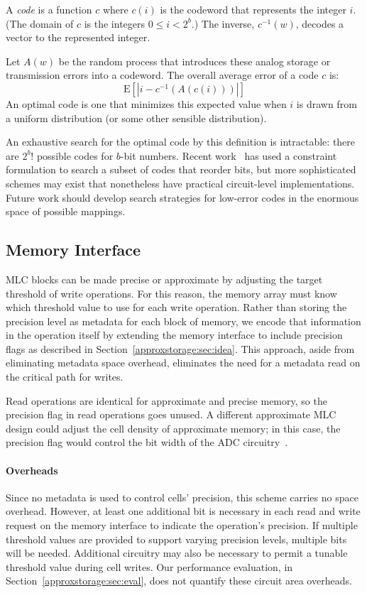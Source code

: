 A \emph{code} is a function $c$ where $c(i)$ is the codeword that
represents the integer $i$. (The domain of $c$ is the integers $0 \le i <
2^b$.) The inverse, $c^{-1}(w)$, decodes a vector to the represented integer.

Let $A(w)$ be the random process that introduces these analog storage or
transmission errors into a codeword.
The overall average error of a code $c$ is:
%
$$\mathrm{E}\!\left[ |i - c^{-1}(A(c(i)))| \right]$$
%
An optimal code is one that minimizes this expected value when $i$
is drawn from a
uniform distribution (or some other sensible distribution).

An exhaustive search for the optimal code by this definition is
intractable: there are $2^b!$ possible codes for $b$-bit numbers.
Recent work~\cite{holcomb-wacas} has used a constraint formulation to search a
subset of codes that reorder bits, but more sophisticated schemes
may exist that nonetheless have practical circuit-level implementations.
Future work should develop search strategies for low-error codes in
the enormous space of possible mappings.


\subsection{Memory Interface}

MLC blocks can be made precise or approximate by adjusting the target threshold of write
operations. For this reason, the memory array must know which threshold value
to use for each write operation. Rather than storing the precision level as
metadata for each block of memory, we encode that information in the operation itself by extending the memory interface to include
precision flags as described in Section~\ref{approxstorage:sec:idea}. This approach, aside
from eliminating metadata space overhead, eliminates the need for a metadata
read on the critical path for writes.

Read operations are identical for approximate and precise memory, so the
precision flag in read operations goes unused. A different approximate MLC
design could adjust the cell density of approximate memory; in this case, the
precision flag would control the bit width of the ADC
circuitry~\cite{morphablepcm}.

\paragraph{Overheads}

Since no metadata is used to control cells' precision, this scheme carries no
space overhead. However, at least one additional bit is necessary in each read
and write request on the memory interface to indicate the operation's
precision. If multiple threshold values are provided to support varying precision
levels, multiple bits will be needed. Additional circuitry may also be
necessary to permit a tunable threshold value during cell writes. Our performance
evaluation, in Section~\ref{approxstorage:sec:eval}, does not quantify these circuit area overheads.

